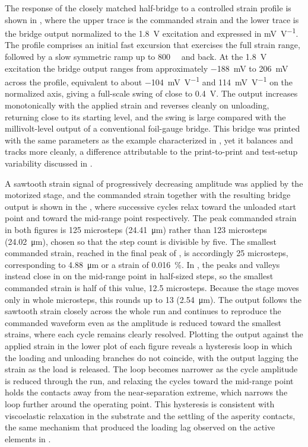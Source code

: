 The response of the closely matched half-bridge to a controlled strain profile is shown in , where the upper trace is the commanded strain and the lower trace is the bridge output normalized to the \SI{1.8}{\volt} excitation and expressed in \si{\milli\volt\per\volt}. The profile comprises an initial fast excursion that exercises the full strain range, followed by a slow symmetric ramp up to \SI{800}{\micro\strain} and back. At the \SI{1.8}{\volt} excitation the bridge output ranges from approximately \SI{-188}{\milli\volt} to \SI{206}{\milli\volt} across the profile, equivalent to about \SI{-104}{\milli\volt\per\volt} and \SI{114}{\milli\volt\per\volt} on the normalized axis, giving a full-scale swing of close to \SI{0.4}{\volt}. The output increases monotonically with the applied strain and reverses cleanly on unloading, returning close to its starting level, and the swing is large compared with the millivolt-level output of a conventional foil-gauge bridge. This bridge was printed with the same parameters as the example characterized in , yet it balances and tracks more cleanly, a difference attributable to the print-to-print and test-setup variability discussed in .

A sawtooth strain signal of progressively decreasing amplitude was applied by the motorized stage, and the commanded strain together with the resulting bridge output is shown in the , where successive cycles relax toward the unloaded start point and toward the mid-range point respectively. 
The peak commanded strain in both figures is \num{125} microsteps (\SI{24.41}{\micro\meter}) rather than \num{123} microsteps (\SI{24.02}{\micro\meter}), chosen so that the step count is divisible by five. The smallest commanded strain, reached in the final peak of , is accordingly \num{25} microsteps, corresponding to \SI{4.88}{\micro\meter} or a strain of \SI{0.016}{\percent}.
In , the peaks and valleys instead close in on the mid-range point in half-sized steps, so the smallest commanded strain is half of this value, \num{12.5} microsteps. Because the stage moves only in whole microsteps, this rounds up to \num{13} (\SI{2.54}{\micro\meter}).
The output follows the sawtooth strain closely across the whole run and continues to reproduce the commanded waveform even as the amplitude is reduced toward the smallest strains, where each cycle remains clearly resolved. Plotting the output against the applied strain in the lower plot of each figure reveals a hysteresis loop in which the loading and unloading branches do not coincide, with the output lagging the strain as the load is released. The loop becomes narrower as the cycle amplitude is reduced through the run, and relaxing the cycles toward the mid-range point holds the contacts away from the near-separation extreme, which narrows the loop further around the operating point. This hysteresis is consistent with viscoelastic relaxation in the substrate and the settling of the asperity contacts, the same mechanism that produced the loading lag observed on the active elements in .


